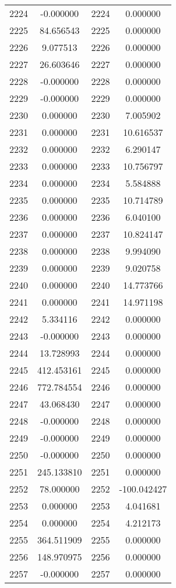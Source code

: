 \documentclass[12pt]{article}
\begin{document}
\begin{longtable}{@{}cccc@{}}
2224 & -0.000000 & 2224 & 0.000000 \\
2225 & 84.656543 & 2225 & 0.000000 \\
2226 & 9.077513 & 2226 & 0.000000 \\
2227 & 26.603646 & 2227 & 0.000000 \\
2228 & -0.000000 & 2228 & 0.000000 \\
2229 & -0.000000 & 2229 & 0.000000 \\
2230 & 0.000000 & 2230 & 7.005902 \\
2231 & 0.000000 & 2231 & 10.616537 \\
2232 & 0.000000 & 2232 & 6.290147 \\
2233 & 0.000000 & 2233 & 10.756797 \\
2234 & 0.000000 & 2234 & 5.584888 \\
2235 & 0.000000 & 2235 & 10.714789 \\
2236 & 0.000000 & 2236 & 6.040100 \\
2237 & 0.000000 & 2237 & 10.824147 \\
2238 & 0.000000 & 2238 & 9.994090 \\
2239 & 0.000000 & 2239 & 9.020758 \\
2240 & 0.000000 & 2240 & 14.773766 \\
2241 & 0.000000 & 2241 & 14.971198 \\
2242 & 5.334116 & 2242 & 0.000000 \\
2243 & -0.000000 & 2243 & 0.000000 \\
2244 & 13.728993 & 2244 & 0.000000 \\
2245 & 412.453161 & 2245 & 0.000000 \\
2246 & 772.784554 & 2246 & 0.000000 \\
2247 & 43.068430 & 2247 & 0.000000 \\
2248 & -0.000000 & 2248 & 0.000000 \\
2249 & -0.000000 & 2249 & 0.000000 \\
2250 & -0.000000 & 2250 & 0.000000 \\
2251 & 245.133810 & 2251 & 0.000000 \\
2252 & 78.000000 & 2252 & -100.042427 \\
2253 & 0.000000 & 2253 & 4.041681 \\
2254 & 0.000000 & 2254 & 4.212173 \\
2255 & 364.511909 & 2255 & 0.000000 \\
2256 & 148.970975 & 2256 & 0.000000 \\
2257 & -0.000000 & 2257 & 0.000000 \\

\end{longtable}
\end{document}
